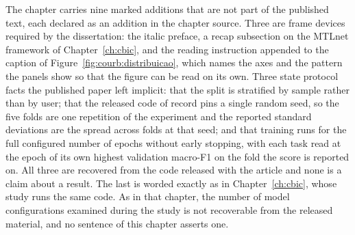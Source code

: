 The chapter carries nine marked additions that are not part of the published text, each
declared as an addition in the chapter source. Three are frame devices required by the
dissertation: the italic preface, a recap subsection on the MTLnet framework of
Chapter~\ref{ch:cbic}, and the reading instruction appended to the caption of
Figure~\ref{fig:courb:distribuicao}, which names the axes and the pattern the panels show
so that the figure can be read on its own. Three state protocol facts the published paper
left implicit: that the split is stratified by sample rather than by user; that the
released code of record pins a single random seed, so the five folds are one repetition of
the experiment and the reported standard deviations are the spread across folds at that
seed; and that training runs for the full configured number of epochs without early
stopping, with each task read at the epoch of its own highest validation macro-F1 on the
fold the score is reported on. All three are recovered from the code released with the
article and none is a claim about a result. The last is worded exactly as in
Chapter~\ref{ch:cbic}, whose study runs the same code. As in that chapter, the number of model
configurations examined during the study is not recoverable from the released material, and no
sentence of this chapter asserts one.
